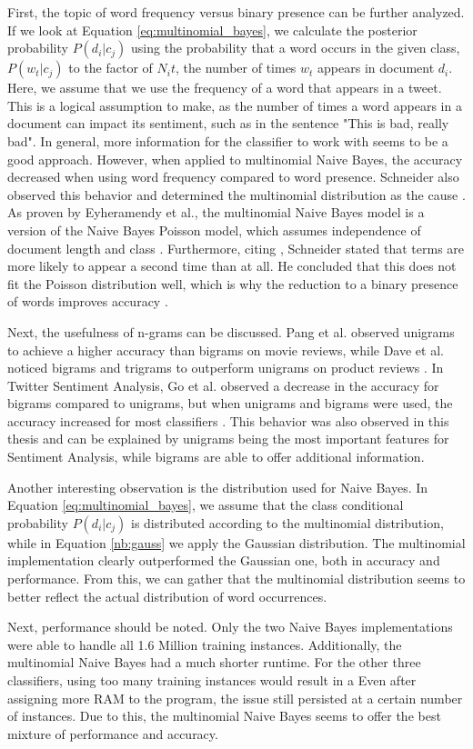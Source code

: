 First, the topic of word frequency versus binary presence can be further analyzed. If we look at Equation \eqref{eq:multinomial_bayes}, we calculate the posterior probability $P(d_i|c_j)$ using the probability that a word occurs in the given class, $P(w_t|c_j)$ to the factor of $N_it$, the number of times $w_t$ appears in document $d_i$. Here, we assume that we use the frequency of a word that appears in a tweet. This is a logical assumption to make, as the number of times a word appears in a document can impact its sentiment, such as in the sentence "This is bad, really bad". In general, more information for the classifier to work with seems to be a good approach. However, when applied to multinomial Naive Bayes, the accuracy decreased when using word frequency compared to word presence. Schneider also observed this behavior and determined the multinomial distribution as the cause \cite{nb_freq}. As proven by Eyheramendy et al., the multinomial Naive Bayes model is a version of the Naive Bayes Poisson model, which assumes independence of document length and class \cite{poisson}. Furthermore, citing \cite{poisson_words}, Schneider stated that terms are more likely to appear a second time than at all. He concluded that this does not fit the Poisson distribution well, which is why the reduction to a binary presence of words improves accuracy \cite{nb_freq}.

Next, the usefulness of n-grams can be discussed. Pang et al. observed unigrams to achieve a higher accuracy than bigrams \cite{pang-etal-2002-thumbs} on movie reviews, while Dave et al. noticed bigrams and trigrams to outperform unigrams on product reviews \cite{dave-et-al}. In Twitter Sentiment Analysis, Go et al. observed a decrease in the accuracy for bigrams compared to unigrams, but when unigrams and bigrams were used, the accuracy increased for most classifiers \cite{GoBHaHua2009}. This behavior was also observed in this thesis and can be explained by unigrams being the most important features for Sentiment Analysis, while bigrams are able to offer additional information.


Another interesting observation is the distribution used for Naive Bayes. In Equation \eqref{eq:multinomial_bayes}, we assume that the class conditional probability $P(d_i|c_j)$ is distributed according to the multinomial distribution, while in Equation \eqref{nb:gauss} we apply the Gaussian distribution. The multinomial implementation clearly outperformed the Gaussian one, both in accuracy and performance. From this, we can gather that the multinomial distribution seems to better reflect the actual distribution of word occurrences.

Next, performance should be noted. Only the two Naive Bayes implementations were able to handle all 1.6 Million training instances. Additionally, the multinomial Naive Bayes had a much shorter runtime. For the other three classifiers, using too many training instances would result in a  Even after assigning more RAM to the program, the issue still persisted at a certain number of instances. Due to this, the multinomial Naive Bayes seems to offer the best mixture of performance and accuracy.